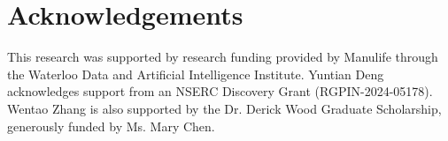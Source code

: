 \section*{Acknowledgements}

This research was supported by research funding provided by Manulife through the Waterloo Data and Artificial Intelligence Institute. Yuntian Deng acknowledges support from an NSERC Discovery Grant (RGPIN-2024-05178). Wentao Zhang is also supported by the Dr. Derick Wood Graduate Scholarship, generously funded by Ms. Mary Chen.
